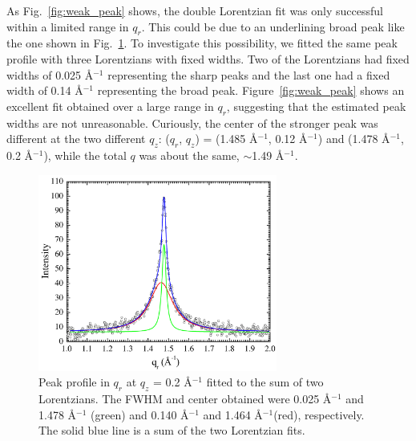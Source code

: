 As Fig.~\ref{fig:weak_peak}
shows, the double Lorentzian fit was only successful within a limited range
in $q_r$. This could be due to an underlining broad peak like the one
shown in Fig.~\ref{fig:strong_peak}. To investigate this possibility,
we fitted the same peak profile with three Lorentzians with fixed widths.
Two of the Lorentzians had fixed widths of 0.025 \AA$^{-1}$ representing 
the sharp peaks and the last one had a fixed width of 0.14 \AA$^{-1}$
representing the broad peak. Figure~\ref{fig:weak_peak} shows an excellent
fit obtained over a large range in $q_r$, suggesting that the estimated
peak widths are not unreasonable.
Curiously, the center of the stronger peak was different at the two 
different $q_z$: ($q_r$, $q_z$) = (1.485 \AA$^{-1}$, 0.12 \AA$^{-1}$)
and (1.478 \AA$^{-1}$, 0.2 \AA$^{-1}$), while the total $q$ was about
the same, $\sim$1.49 \AA$^{-1}$.

\begin{figure}[htbp]
  \centering
  \includegraphics[width=0.7\textwidth]{figures/ripple/nGIWAXS/strong_peak_Lorentz}
  \caption[Peak profile in $q_r$ at $q_z$ = 0.2 \AA$^{-1}$ 
  fitted to the sum of two Lorentzians]
  {Peak profile in $q_r$ at $q_z$ = 0.2 \AA$^{-1}$ 
  fitted to the sum of two Lorentzians. The FWHM and center obtained 
  were 0.025 \AA$^{-1}$ and 1.478 \AA$^{-1}$ (green) and 0.140 \AA$^{-1}$ 
  and 1.464 \AA$^{-1}$(red), respectively. The solid blue line is a sum
  of the two Lorentzian fits.}
  \label{fig:strong_peak}
\end{figure}

